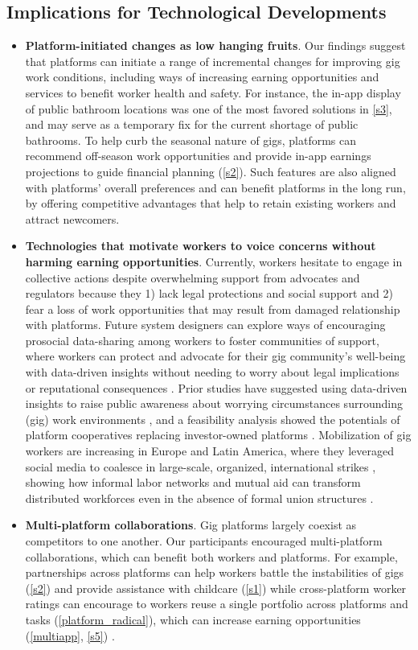 \subsection{Implications for Technological Developments}
\begin{itemize}
  \item \textbf{Platform-initiated changes as low hanging fruits}. Our findings suggest that platforms can initiate a range of incremental changes for improving gig work conditions, including ways of increasing earning opportunities and services to benefit worker health and safety. For instance, the in-app display of public bathroom locations was one of the most favored solutions in \ref{s3}, and may serve as a temporary fix for the current shortage of public bathrooms. To help curb the seasonal nature of gigs, platforms can recommend off-season work opportunities and provide in-app earnings projections to guide financial planning (\ref{s2}). Such features are also aligned with platforms' overall preferences and can benefit platforms in the long run, by offering competitive advantages that help to retain existing workers and attract newcomers.   
  \item \textbf{Technologies that motivate workers to voice concerns without harming earning opportunities}. Currently, workers hesitate to engage in collective actions despite overwhelming support from advocates and regulators because they 1) lack legal protections and social support and 2) fear a loss of work opportunities that may result from damaged relationship with platforms. Future system designers can explore ways of encouraging prosocial data-sharing among workers to foster communities of support, where workers can protect and advocate for their gig community's well-being with data-driven insights without needing to worry about legal implications or reputational consequences \cite{end}. Prior studies have suggested using data-driven insights to raise public awareness about worrying circumstances surrounding (gig) work environments \cite{Khovanskaya2019-xo, end}, and a feasibility analysis showed the potentials of platform cooperatives replacing investor-owned platforms \cite{bunders2022feasibility}. 
  Mobilization of gig workers are increasing in Europe \cite{cini2022or} and Latin America, where they leveraged social media to coalesce in large-scale, organized, international strikes \cite{boss}, showing how informal labor networks and mutual aid can transform distributed workforces even in the absence of formal union structures \cite{qadri2021s}. 
  \item \textbf{Multi-platform collaborations}. Gig platforms largely coexist as competitors to one another. Our participants encouraged multi-platform collaborations, which can benefit both workers and platforms. For example, partnerships across platforms can help workers battle the instabilities of gigs (\ref{s2}) and provide assistance with childcare (\ref{s1}) while cross-platform worker ratings can encourage to workers reuse a single portfolio across platforms and tasks (\ref{platform_radical}), which can increase earning opportunities (\ref{multiapp}, \ref{s5}) \cite{personal}. 

\end{itemize}
